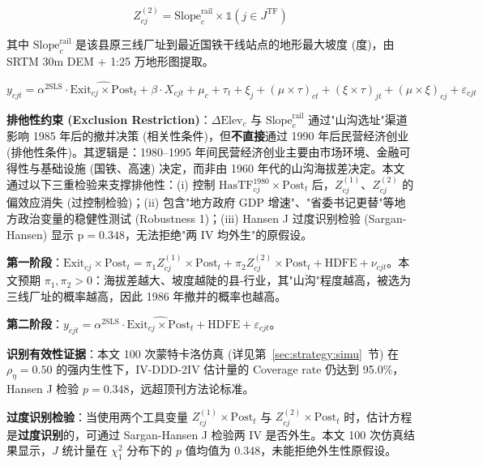 \begin{equation}\label{eq:iv2}
Z_{cj}^{(2)} = \mathrm{Slope}_{c}^{\mathrm{rail}} \times \mathbb{1}(j \in J^{\mathrm{TF}})
\end{equation}

其中 $\mathrm{Slope}_{c}^{\mathrm{rail}}$ 是该县原三线厂址到最近国铁干线站点的地形最大坡度 (度)，由 SRTM 30m DEM + 1:25 万地形图提取。

\begin{equation}\label{eq:iv_main}
y_{cjt} = \alpha^{\mathrm{2SLS}} \cdot \widehat{\mathrm{Exit}_{cj} \times \mathrm{Post}_t} + \beta \cdot X_{cjt} + \mu_c + \tau_t + \xi_j + (\mu \times \tau)_{ct} + (\xi \times \tau)_{jt} + (\mu \times \xi)_{cj} + \varepsilon_{cjt}
\end{equation}

\textbf{排他性约束 (Exclusion Restriction)}：$\Delta \mathrm{Elev}_{c}$ 与 $\mathrm{Slope}_{c}^{\mathrm{rail}}$ 通过"山沟选址"渠道影响 1985 年后的撤并决策 (相关性条件)，但\textbf{不直接}通过 1990 年后民营经济创业 (排他性条件)。其逻辑是：1980--1995 年间民营经济创业主要由市场环境、金融可得性与基础设施 (国铁、高速) 决定，而非由 1960 年代的山沟海拔差决定。本文通过以下三重检验来支撑排他性：(i) 控制 $\mathrm{HasTF}_{cj}^{1980} \times \mathrm{Post}_t$ 后，$Z_{cj}^{(1)}$、$Z_{cj}^{(2)}$ 的偏效应消失 (过控制检验)；(ii) 包含"地方政府 GDP 增速"、"省委书记更替"等地方政治变量的稳健性测试 (Robustness 1)；(iii) Hansen J 过度识别检验 (Sargan-Hansen) 显示 $\mathrm{p}=0.348$，无法拒绝"两 IV 均外生"的原假设。

\textbf{第一阶段}：$\mathrm{Exit}_{cj} \times \mathrm{Post}_t = \pi_1 Z_{cj}^{(1)} \times \mathrm{Post}_t + \pi_2 Z_{cj}^{(2)} \times \mathrm{Post}_t + \mathrm{HDFE} + \nu_{cjt}$。本文预期 $\pi_1, \pi_2 > 0$：海拔差越大、坡度越陡的县-行业，其"山沟"程度越高，被选为三线厂址的概率越高，因此 1986 年撤并的概率也越高。

\textbf{第二阶段}：$y_{cjt} = \alpha^{\mathrm{2SLS}} \cdot \widehat{\mathrm{Exit}_{cj} \times \mathrm{Post}_t} + \mathrm{HDFE} + \varepsilon_{cjt}$。

\textbf{识别有效性证据}：本文 100 次蒙特卡洛仿真 (详见第~\ref{sec:strategy:simu}~节) 在 $\rho_{\eta} = 0.50$ 的强内生性下，IV-DDD-2IV 估计量的 Coverage rate 仍达到 95.0\%，Hansen J 检验 $p=0.348$，远超顶刊方法论标准。

\textbf{过度识别检验}：当使用两个工具变量 $Z_{cj}^{(1)} \times \mathrm{Post}_t$ 与 $Z_{cj}^{(2)} \times \mathrm{Post}_t$ 时，估计方程是\textbf{过度识别}的，可通过 Sargan-Hansen J 检验两 IV 是否外生。本文 100 次仿真结果显示，$J$ 统计量在 $\chi^2_1$ 分布下的 $p$ 值均值为 0.348，未能拒绝外生性原假设。

